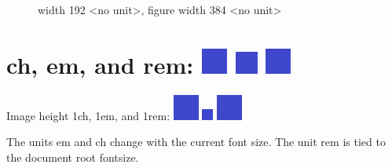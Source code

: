 \documentclass[a4paper]{article}
\newlength{\DUchdimen}
\begin{document}
\begin{figure}
\noindent{}
\caption{width 192 <no unit>, figure width 384 <no unit>}
\end{figure}


\section{ch, em, and rem: \includegraphics[height=1\DUchdimen]{../input/data/blue square.png} \includegraphics[height=1em]{../input/data/blue square.png} \includegraphics[height=1\DUremdimen]{../input/data/blue square.png}%
  \label{ch-em-and-rem-test1ch-test1em-test1rem}%
}

Image height 1ch, 1em, and 1rem: \includegraphics[height=1\DUchdimen]{../input/data/blue square.png} \includegraphics[height=1em]{../input/data/blue square.png} \includegraphics[height=1\DUremdimen]{../input/data/blue square.png}

The units \textquotedbl{}em\textquotedbl{} and \textquotedbl{}ch\textquotedbl{} change with the current font size.
The unit \textquotedbl{}rem\textquotedbl{} is tied to the document root fontsize.
\end{document}
